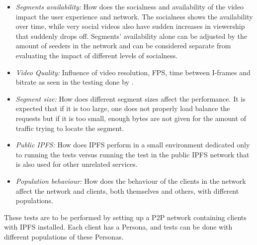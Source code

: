 \begin{itemize}
   \item \textit{Segments availability:}
    How does the socialness and availability of the video impact the user experience and network. The socialness shows the availability over time, while very social videos also have sudden increases in viewership that suddenly drops off. Segments' availability alone can be adjusted by the amount of seeders in the network and can be considered separate from evaluating the impact of different levels of socialness.
    
    \item \textit{Video Quality:}
    Influence of video resolution, \ac{FPS}, time between \acp{I-frame} and bitrate as seen in the testing done by \citeauthor{aloman2015performance}.
    
    \item \textit{Segment size:}
    How does different segment sizes affect the performance. It is expected that if it is too large, one does not properly load balance the requests but if it is too small, enough bytes are not given for the amount of traffic trying to locate the segment.

    \item \textit{Public IPFS:}
    How does \ac{IPFS} perform in a small environment dedicated only to running the tests versus running the test in the public \ac{IPFS} network that is also used for other unrelated services.
    
    \item \textit{Population behaviour:}
    How does the behaviour of the clients in the network affect the network and clients, both themselves and others, with different populations.
\end{itemize}

These tests are to be performed by setting up a \ac{P2P} network containing clients with \ac{IPFS} installed. Each client has a Persona, and tests can be done with different populations of these Personas.

